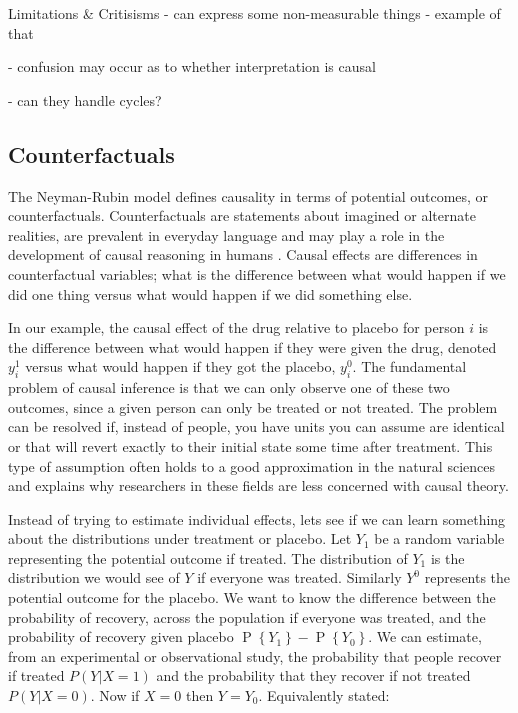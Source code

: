 \documentclass[11pt,a4paper,oneside]{book}
\renewcommand{\P}[1]{\operatorname{P}\left\{#1\right\}}
\newcommand{\cf}[2]{{#1}_{#2}}
\begin{document}
Limitations \& Critisisms 
- can express some non-measurable things
	- example of that

- confusion may occur as to whether interpretation is causal

- can they handle cycles?


\subsection*{Counterfactuals}

The Neyman-Rubin model \cite{Rubin1974,Rubin1978,Rosenbaum1983, Rubin2005,Rubin2008} defines causality in terms of potential outcomes, or counterfactuals. Counterfactuals are statements about imagined or alternate realities, are prevalent in everyday language and may play a role in the development of causal reasoning in humans \cite{Weisberg2013}. Causal effects are differences in counterfactual variables; what is the difference between what would happen if we did one thing versus what would happen if we did something else. 

In our example, the causal effect of the drug relative to placebo for person $i$ is the difference between what would happen if they were given the drug, denoted $y_{i}^{1}$ versus what would happen if they got the placebo, $y_{i}^{0}$. The fundamental problem of causal inference is that we can only observe one of these two outcomes, since a given person can only be treated or not treated. The problem can be resolved if, instead of people, you have units you can assume are identical or that will revert exactly to their initial state some time after treatment. This type of assumption often holds to a good approximation in the natural sciences and explains why researchers in these fields are less concerned with causal theory. 

Instead of trying to estimate individual effects, lets see if we can learn something about the distributions under treatment or placebo.  Let $\cf{Y}{1}$ be a random variable representing the potential outcome if treated. The distribution of $\cf{Y}{1}$ is the distribution we would see of $Y$ if everyone was treated. Similarly $Y^{0}$ represents the potential outcome for the placebo. We want to know the difference between the probability of recovery, across the population if everyone was treated, and the probability of recovery given placebo  $\P{\cf{Y}{1}}-\P{\cf{Y}{0}}$. We can estimate, from an experimental or observational study, the probability that people recover if treated $P(Y|X=1)$ and the probability that they recover if not treated $P(Y|X=0)$. Now if $X=0$ then $Y = \cf{Y}{0}$. Equivalently stated:
\end{document}

